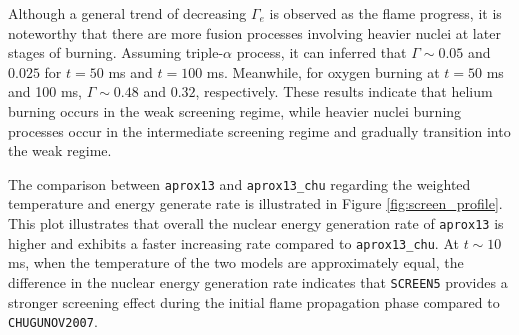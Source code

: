 \documentclass[preprint,times,tighten]{aastex631}
\begin{document}
Although a general trend of decreasing $\Gamma_e$ is observed as the flame progress, it is noteworthy that there are more fusion processes involving heavier nuclei at later stages of burning. Assuming triple-$\alpha$ process, it can inferred that $\Gamma \sim 0.05$ and $0.025$ for $t = 50$ ms and $t = 100$ ms. Meanwhile, for oxygen burning at $t = 50$ ms and 100 ms, $\Gamma \sim 0.48$ and $0.32$, respectively. These results indicate that helium burning occurs in the weak screening regime, while heavier nuclei burning processes occur in the intermediate screening regime and gradually transition into the weak regime.




\begin{figure*}
\centering
{}
\caption{\label{fig:screen_profile} Time profiles showing the weighted temperature and energy generation rate of the burning front for {\tt aprox13} and {\tt aprox13\_chu}.}
\end{figure*}


The comparison between {\tt aprox13} and {\tt aprox13\_chu} regarding the weighted temperature and energy generate rate is illustrated in Figure \ref{fig:screen_profile}. This plot illustrates that overall the nuclear energy generation rate of {\tt aprox13} is higher and exhibits a faster increasing rate compared to {\tt aprox13\_chu}. At $t \sim 10$ ms, when the temperature of the two models are approximately equal, the difference in the nuclear energy generation rate indicates that {\tt SCREEN5} provides a stronger screening effect during the initial flame propagation phase compared to {\tt CHUGUNOV2007}.

\end{document}

